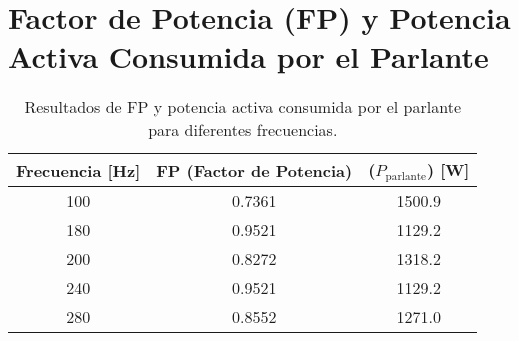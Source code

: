 
\section*{Factor de Potencia (FP) y Potencia Activa Consumida por el Parlante}

\begin{table}[h!]
\centering
\begin{tabular}{ccc}
\toprule
\textbf{Frecuencia [Hz]} & \textbf{FP (Factor de Potencia)} & \textbf{($P_{\text{parlante}}$) [W]} \\
\midrule
100  & 0.7361 & 1500.9 \\
180  & 0.9521 & 1129.2 \\
200  & 0.8272 & 1318.2 \\
240  & 0.9521 & 1129.2 \\
280  & 0.8552 & 1271.0 \\
\bottomrule
\end{tabular}
\caption{Resultados de FP y potencia activa consumida por el parlante para diferentes frecuencias.}
\label{table:resultados}
\end{table}
